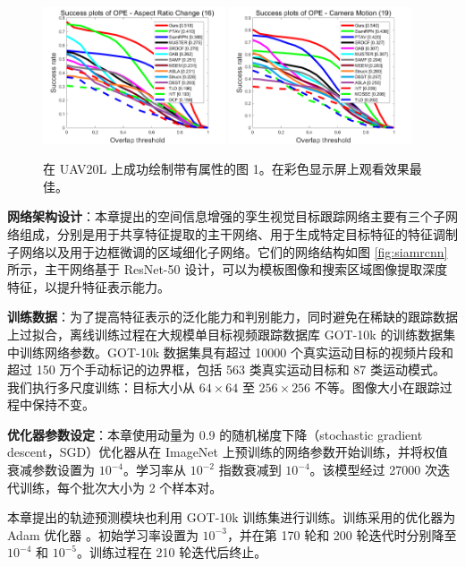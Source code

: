 \begin{figure}[t!]
\begin{center}
	\includegraphics[width=0.48\textwidth]{Img/globally/UAV20L/ARC_overlap_OPE_AUC.png}
	\includegraphics[width=0.48\textwidth]{Img/globally/UAV20L/CM_overlap_OPE_AUC.png}
\end{center}
   \caption{在 UAV20L 上成功绘制带有属性的图 1。在彩色显示屏上观看效果最佳。}
\label{fig:globally_uav20l_1}
\end{figure}

\textbf{网络架构设计}：本章提出的空间信息增强的孪生视觉目标跟踪网络主要有三个子网络组成，分别是用于共享特征提取的主干网络、用于生成特定目标特征的特征调制子网络以及用于边框微调的区域细化子网络。它们的网络结构如图 \ref{fig:siamrcnn} 所示，主干网络基于 ResNet-50 设计，可以为模板图像和搜索区域图像提取深度特征，以提升特征表示能力。

\textbf{训练数据}：为了提高特征表示的泛化能力和判别能力，同时避免在稀缺的跟踪数据上过拟合，离线训练过程在大规模单目标视频跟踪数据库 GOT-10k \cite{GOT-10k} 的训练数据集中训练网络参数。GOT-10k 数据集具有超过 10000 个真实运动目标的视频片段和超过 150 万个手动标记的边界框，包括 563 类真实运动目标和 87 类运动模式。
我们执行多尺度训练：目标大小从 $64 \times 64$ 至 $256 \times 256$ 不等。图像大小在跟踪过程中保持不变。

\textbf{优化器参数设定}：本章使用动量为 0.9 的随机梯度下降（stochastic gradient descent，SGD）优化器从在 ImageNet 上预训练的网络参数开始训练，并将权值衰减参数设置为 $10^{-4}$。学习率从 $10^{-2}$ 指数衰减到 $10^{-4}$。该模型经过 27000 次迭代训练，每个批次大小为 2 个样本对。

本章提出的轨迹预测模块也利用 GOT-10k 训练集进行训练。训练采用的优化器为 Adam 优化器 \cite{kingma2014adam}。初始学习率设置为 $10^{-3}$，并在第 170 轮和 200 轮迭代时分别降至 $10^{-4}$ 和 $10^{-5}$。训练过程在 210 轮迭代后终止。

